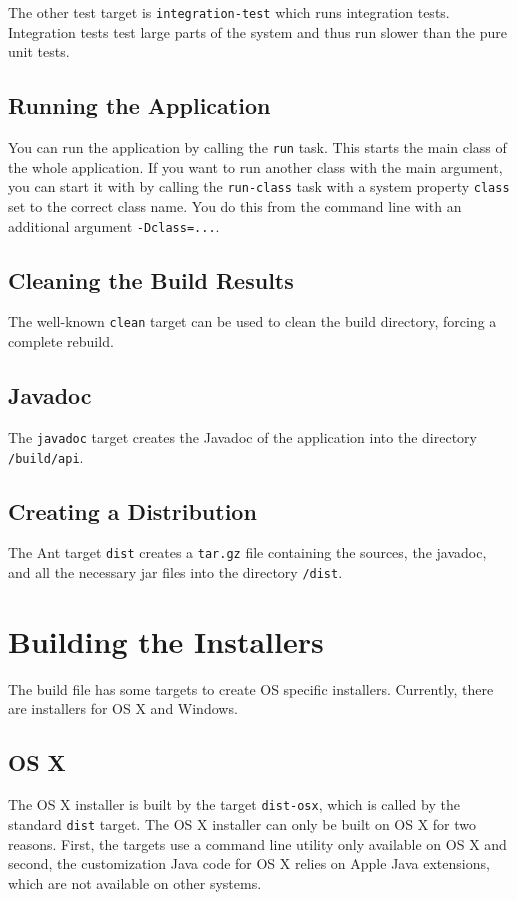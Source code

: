 \documentclass[11pt,a4paper]{article}
\begin{document}
The other test target is \texttt{integration-test} which runs integration tests.
Integration tests test large parts of the system and thus run slower than
the pure unit tests.

\subsection{Running the Application}
You can run the application by calling the \texttt{run} task. This starts
the main class of the whole application. If you want to run another class
with the main argument, you can start it with by calling the \texttt{run-class}
task with a system property \texttt{class} set to the correct class name.
You do this from the command line with an additional argument 
\texttt{-Dclass=...}.

\subsection{Cleaning the Build Results}
The well-known \texttt{clean} target can be used to clean the build directory,
forcing a complete rebuild.

\subsection{Javadoc}
The \texttt{javadoc} target creates the Javadoc of the application into the
directory \texttt{/build/api}.

\subsection{Creating a Distribution}
The Ant target \texttt{dist} creates a \texttt{tar.gz} file containing the
sources, the javadoc, and all the necessary jar files into the directory
\texttt{/dist}.


\section{Building the Installers}

The build file has some targets to create OS specific installers. Currently,
there are installers for OS X and Windows.

\subsection{OS X}
The OS X installer is built by the target \texttt{dist-osx}, which is 
called by the standard \texttt{dist} target. The OS X installer can only
be built on OS X for two reasons. First, the targets use a command line
utility only available on OS X and second, the customization Java code
for OS X relies on Apple Java extensions, which are not available on
other systems.
\end{document}
